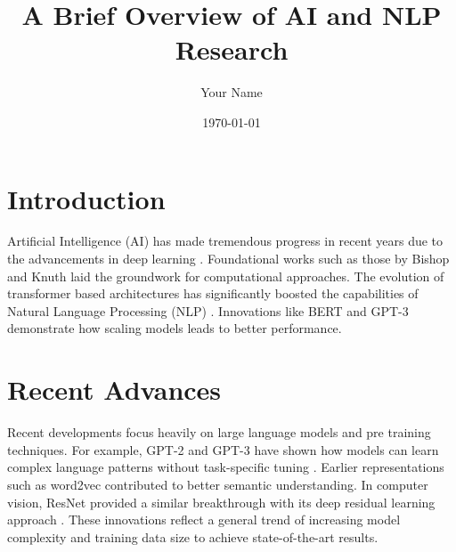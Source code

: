 \documentclass[12pt]{article}
\begin{document}
 
\title{A Brief Overview of AI and NLP Research} 
\author{Your Name} 
\date{\today} 
\maketitle 
\section*{Introduction} 
Artificial Intelligence (AI) has made tremendous progress in recent years 
due to the advancements in deep learning \cite{lecun2015deep, 
goodfellow2016deep}. Foundational works such as those by Bishop 
\cite{bishop2006pattern} and Knuth \cite{knuth1984texbook} laid the 
groundwork for computational approaches. The evolution of transformer
based architectures has significantly boosted the capabilities of Natural 
Language Processing (NLP) \cite{vaswani2017attention, devlin2018bert}. 
Innovations 
like 
BERT 
\cite{devlin2018bert} 
and 
GPT-3 
\cite{brown2020gpt3} demonstrate how scaling models leads to better 
performance.  
\section*{Recent Advances} 
Recent developments focus heavily on large language models and pre
training techniques. For example, GPT-2 and GPT-3 have shown how 
models can learn complex language patterns without task-specific tuning 
\cite{radford2019gpt2, brown2020gpt3}. Earlier representations such as 
word2vec \cite{mikolov2013word2vec} contributed to better semantic 
understanding. In computer vision, ResNet provided a similar breakthrough 
with its deep residual learning approach \cite{he2016resnet}. These 
innovations reflect a general trend of increasing model complexity and 
training data size to achieve state-of-the-art results. 
\printbibliography 
\end{document}
